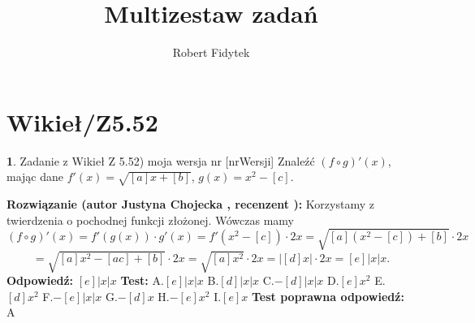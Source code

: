 \documentclass[12pt, a4paper]{article}
\title{Multizestaw zadań}
\author{Robert Fidytek}
\date{}
\theoremstyle{definition} %
\newtheorem{zad}{}
\newcommand{\kategoria}[1]{\section{#1}} %
\newcommand{\zadStart}[1]{\begin{zad}#1\newline} %
\newcommand{\zadStop}{\end{zad}}   %
\newcommand{\rozwStart}[2]{\noindent \textbf{Rozwiązanie (autor #1 , recenzent #2): }\newline} %
\newcommand{\rozwStop}{\newline}                                            %
\newcommand{\odpStart}{\noindent \textbf{Odpowiedź:}\newline}    %
\newcommand{\odpStop}{\newline}                                             %
\newcommand{\testStart}{\noindent \textbf{Test:}\newline} %
\newcommand{\testStop}{\newline} %
\newcommand{\kluczStart}{\noindent \textbf{Test poprawna odpowiedź:}\newline} %
\newcommand{\kluczStop}{\newline} %
\begin{document}
\maketitle


\kategoria{Wikieł/Z5.52}
\zadStart{Zadanie z Wikieł Z 5.52) moja wersja nr [nrWersji]}
Znaleźć $(f\circ g)'(x)$, mając dane $f'(x)=\sqrt{[a]x+[b]}$, $g(x)=x^{2}-[c]$.
\zadStop
\rozwStart{Justyna Chojecka}{}
Korzystamy z twierdzenia o pochodnej funkcji złożonej. Wówczas mamy
$$(f\circ g)'(x)=f'(g(x))\cdot g'(x)=f'(x^{2}-[c])\cdot 2x=\sqrt{[a](x^{2}-[c])+[b]}\cdot 2x$$$$=\sqrt{[a]x^{2}-[ac]+[b]}\cdot 2x=\sqrt{[a]x^{2}}\cdot 2x=|[d]x|\cdot 2x=[e]|x|x.$$
\rozwStop
\odpStart
$[e]|x|x$
\odpStop
\testStart
A.$[e]|x|x$
B.$[d]|x|x$
C.$-[d]|x|x$
D.$[e]x^{2}$
E.$[d]x^{2}$
F.$-[e]|x|x$
G.$-[d]x$
H.$-[e]x^{2}$
I.$[e]x$
\testStop
\kluczStart
A
\kluczStop
\end{document}
